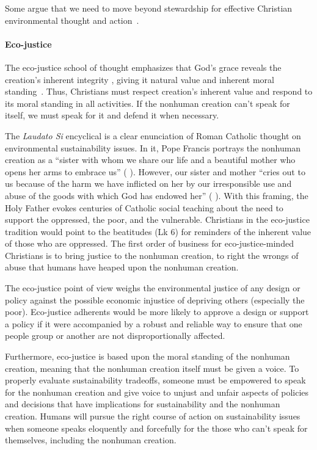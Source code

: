 \documentclass[12pt]{article}
\begin{document}
Some argue that we need to move beyond stewardship 
for effective Christian environmental thought and action~\autocite{WarnersHeun:2019aa}.


\paragraph{Eco-justice} 
\label{sec:eco-justice}

The eco-justice school of thought 
emphasizes that God's grace reveals the creation's 
inherent integrity \autocite[19]{Jenkins:2008}, 
giving it natural value and inherent moral standing~\autocite{Joldersma:2019}. 
Thus, Christians must respect creation's inherent value and 
respond to its moral standing in all activities.
If the nonhuman creation can't speak for itself, 
we must speak for it and defend it when necessary.

The \emph{Laudato Si} encyclical \autocite{Pope-Francis:2015aa} 
is a clear enunciation of Roman Catholic thought
on environmental sustainability issues.
In it, Pope Francis portrays the nonhuman creation as a
``sister with whom we share our life and a beautiful mother who opens her arms to embrace us''
(\textcite{Pope-Francis:2015aa} \textcite[3]{Pope-Francis:2015aa}).
However, our sister and mother
``cries out to us because of the harm we have inflicted on her 
by our irresponsible use and abuse of the goods with which God has endowed her''
(\textcite{Pope-Francis:2015aa} \textcite[3]{Pope-Francis:2015aa}).
With this framing, the Holy Father evokes centuries of Catholic social teaching
about the need to support the oppressed, the poor, and the vulnerable.
Christians in the eco-justice tradition would point to the beatitudes (Lk 6) 
for reminders of the inherent value of those who are oppressed.
The first order of business for eco-justice-minded Christians
is to bring justice to the nonhuman creation, to right the wrongs
of abuse that humans have heaped upon the nonhuman creation.

The eco-justice point of view
weighs the environmental justice of any design or policy
against the possible economic injustice of depriving others
(especially the poor). 
Eco-justice adherents would be more likely to approve a design or support a policy if it
were accompanied by a robust and reliable way to ensure that one people group or another
are not disproportionally affected.

Furthermore, eco-justice is based upon the moral standing of the nonhuman creation,
meaning that the nonhuman creation itself must be given a voice.
To properly evaluate sustainability tradeoffs,
someone must be empowered to speak for the nonhuman creation and
give voice to unjust and unfair aspects of policies and decisions
that have implications for sustainability and the nonhuman creation.
Humans will pursue the right course of action on sustainability issues
when someone speaks eloquently and forcefully for the
those who can't speak for themselves, including the nonhuman creation.
\end{document}
